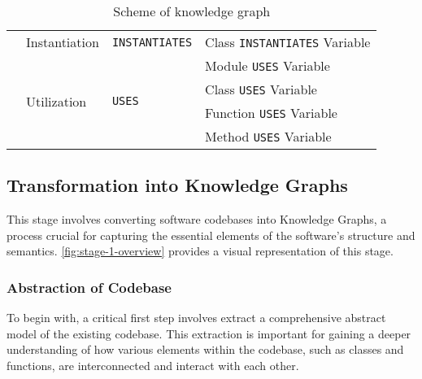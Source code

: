 \begin{table*}[h]
\begin{threeparttable}
\begin{tabular}{|p{1.6cm}||p{1.7cm}|p{2cm}|p{11.155cm}|}
                        & \multirow{1}{*}{Instantiation} & \multirow{1}{*}{\texttt{INSTANTIATES}} & Class \texttt{INSTANTIATES} Variable       \\ \cline{2-4}
                        
                        & \multirow{4}{*}{Utilization}  & \multirow{4}{*}{\texttt{USES}}    & Module \texttt{USES} Variable       \\ 
                        &                               &                                   & Class \texttt{USES} Variable        \\ 
                        &                               &                                   & Function \texttt{USES} Variable     \\ 
                        &                               &                                   & Method \texttt{USES} Variable       \\ \cline{2-4}
                    

\hline
\end{tabular}
\small
\caption{Scheme of knowledge graph}
\label{tab:ents-and-rels}
\end{threeparttable}
\end{table*}








\subsection{Transformation into Knowledge Graphs}
This stage involves converting software codebases into Knowledge Graphs, a process crucial for capturing the essential elements of the software's structure and semantics. \autoref{fig:stage-1-overview} provides a visual representation of this stage.

\subsubsection{Abstraction of Codebase} 
To begin with, a critical first step involves extract a comprehensive abstract model of the existing codebase. This extraction is important for gaining a deeper understanding of how various elements within the codebase, such as classes and functions, are interconnected and interact with each other. 


